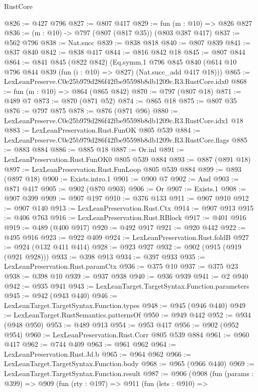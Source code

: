 \begin{lexlean}{RustCore}
\begin{coremodule}
@826 := @427 @796
@827 := @807 @417
@829 := fun (m : @10) => @826 @827
@836 := (m : @10) -> @797 (@807 (@817 @35)) (@803 @387 @417)
@837 := @562 @796
@838 := Nat.succ
@839 := @838 @818
@840 := @807 @839
@841 := @837 @840
@842 := @838 @417
@844 := @816 @842 @18
@845 := @807 @844
@864 := @841
    @845
    (@822 @842)
    (Eq.symm.{1}
      @796
      @845
      @840
      (@614 @10 @796 @844 @839 (fun (i : @10) => @827) (Nat.succ_add @417 @18)))
@865 := LexLeanPreserve.C0e25b979d286f42fbe95598b8db1209c.R3.RustCore.idx0
@868 := fun (m : @10) => @864 (@865 @842)
@870 := @797 (@807 @18)
@871 := @489 @7
@873 := @870 (@871 @52)
@874 := @865 @18
@875 := @807 @35
@876 := @797 @875
@878 := @876 (@871 @96)
@880 := LexLeanPreserve.C0e25b979d286f42fbe95598b8db1209c.R3.RustCore.idx1 @18
@883 := LexLeanPreservation.Rust.FunOK @805 @539
@884 := LexLeanPreserve.C0e25b979d286f42fbe95598b8db1209c.R3.RustCore.flags
@885 := @883 @884
@886 := @885 @18
@887 := Or.inl
@891 := LexLeanPreservation.Rust.FunOK0 @805 @539 @884
@893 := @887 (@891 @18)
@897 := LexLeanPreservation.Rust.FunLoop @805 @539 @884
@899 := @893 (@897 @18)
@900 := Exists.intro.{1}
@901 := @900 @7
@902 := And
@903 := @871 @417
@905 := @902 (@870 @903)
@906 := Or
@907 := Exists.{1}
@908 := @907 @399
@909 := @907 @197
@910 := @376 @133
@911 := @907 @910
@912 := @907 @140
@913 := LexLeanPreservation.Rust.Ctx
@914 := @907 @913
@915 := @406 @763
@916 := LexLeanPreservation.Rust.RBlock
@917 := @401 @916
@919 := @489 (@400 @917)
@920 := @492 @917
@921 := @920 @442
@922 := @495 @916
@923 := @922 @409
@924 := LexLeanPreservation.Rust.foldB
@927 := @924 (@132 @411 @414)
@928 := @923 @927
@932 := @902 (@915 (@919 (@921 @928)))
@933 := @398 @913
@934 := @397 @933
@935 := LexLeanPreservation.Rust.paramCtx
@936 := @375 @10
@937 := @375 @23
@938 := @398 @10
@939 := @937 @938
@940 := @936 @939
@941 := @2 @940
@942 := @935 @941
@943 := LexLeanTarget.TargetSyntax.Function.parameters
@945 := @942 (@943 @440)
@946 := LexLeanTarget.TargetSyntax.Function.types
@948 := @945 (@946 @440)
@949 := LexLeanTarget.RustSemantics.patternsOf
@950 := @949 @442
@952 := @934 (@948 @950)
@953 := @489 @913
@954 := @953 @417
@956 := @902 (@952 @954)
@960 := LexLeanPreservation.Rust.Corr @805 @539 @884
@961 := @960 @417
@962 := @744 @409
@963 := @961 @962
@964 := LexLeanPreservation.Rust.Jd.b
@965 := @964 @962
@966 := LexLeanTarget.TargetSyntax.Function.body
@968 := @965 (@966 @440)
@969 := LexLeanTarget.TargetSyntax.Function.result
@987 := @906
    (@908
      (fun (params : @399) =>
      @909
        (fun (rty : @197) =>
        @911
          (fun (lets : @910) =>

\end{coremodule}
\end{lexlean}

